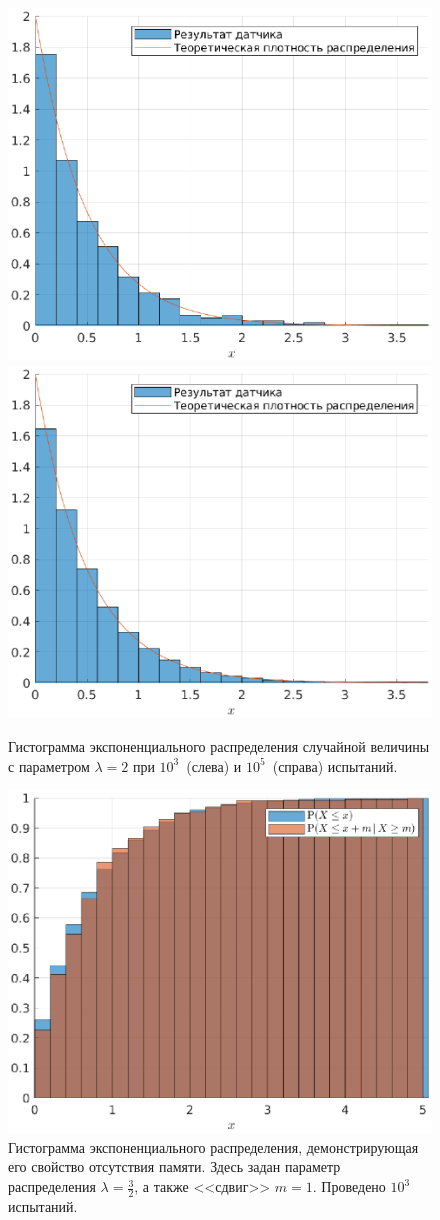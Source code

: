 \clearpage
\begin{figure}[t]
        \includegraphics[width=0.5\linewidth]{task_03/exp2-1000.eps}
        \includegraphics[width=0.5\linewidth]{task_03/exp2-100000.eps}
        \caption{Гистограмма экспоненциального распределения случайной величины с параметром $\lambda = 2$ при $10^3$~(слева) и $10^5$~(справа) испытаний.}
\end{figure}
\begin{figure}[h]
        \includegraphics[width=\linewidth]{task_03/mem2-1000-1.eps}
        \caption{Гистограмма экспоненциального распределения, демонстрирующая его свойство отсутствия памяти. Здесь задан параметр распределения $\lambda = \frac{3}{2}$, а также <<сдвиг>> $m = 1$. Проведено $10^3$ испытаний.}
\end{figure}

